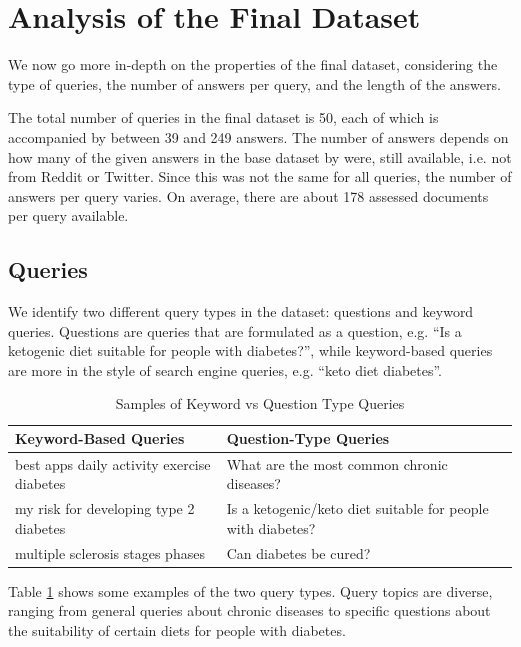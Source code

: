\section{Analysis of the Final Dataset}
We now go more in-depth on the properties of the final dataset, considering the type of queries, the number of answers per query, and the length of the answers.

The total number of queries in the final dataset is 50, each of which is accompanied by between 39 and 249 answers.
The number of answers depends on how many of the given answers in the base dataset by \cite{goeuriot:2021:Consumer} were, still available, i.e. not from Reddit or Twitter.
Since this was not the same for all queries, the number of answers per query varies.
On average, there are about 178 assessed documents per query available.

\subsection{Queries}
We identify two different query types in the dataset: questions and keyword queries.
Questions are queries that are formulated as a question, e.g. ``Is a ketogenic diet suitable for people with diabetes?'', while keyword-based queries are more in the style of search engine queries, e.g. ``keto diet diabetes''.
\begin{table}[tb]
\centering
\begin{tabularx}{\textwidth}{XX}
\hline
\textbf{Keyword-Based Queries} & \textbf{Question-Type Queries} \\
\hline
best apps daily activity exercise diabetes & What are the most common chronic diseases? \\
\hline
my risk for developing type 2 diabetes & Is a ketogenic/keto diet suitable for people with diabetes? \\
\hline
multiple sclerosis stages phases & Can diabetes be cured? \\
\hline
\end{tabularx}
\caption{Samples of Keyword vs Question Type Queries}
\label{table:querie-samples}
\end{table}
Table \ref{table:querie-samples} shows some examples of the two query types.
Query topics are diverse, ranging from general queries about chronic diseases to specific questions about the suitability of certain diets for people with diabetes.

